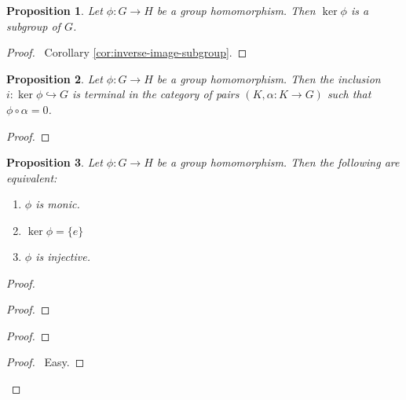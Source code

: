 \documentclass{book}
\let\qed\relax
\newtheorem{prop}{Proposition}[chapter]
\theoremstyle{definition}
\newcommand{\inv}[1]{\ensuremath{{#1}^{-1}}}
\begin{document}
\begin{prop}
Let $\phi : G \rightarrow H$ be a group homomorphism. Then $\ker \phi$ is a subgroup of $G$.
\end{prop}

\begin{proof}
\pf\ Corollary \ref{cor:inverse-image-subgroup}. \qed
\end{proof}

\begin{prop}
Let $\phi : G \rightarrow H$ be a group homomorphism. Then the inclusion $i : \ker \phi \hookrightarrow G$ is terminal in the category of pairs $(K,\alpha : K \rightarrow G)$ such that $\phi \circ \alpha = 0$.
\end{prop}

\begin{proof}
\pf
{}
\qed
\end{proof}

\begin{prop}
Let $\phi : G \rightarrow H$ be a group homomorphism. Then the following are equivalent:
\begin{enumerate}
\item $\phi$ is monic.
\item $\ker \phi = \{e\}$
\item $\phi$ is injective.
\end{enumerate}
\end{prop}

\begin{proof}
\pf
{}
\begin{proof}
\end{proof}
\begin{proof}
	\step{d}{$\phi(x\inv{y}) = e$}
	\step{e}{$x \inv{y} \in \ker \phi$}
	\step{f}{$x \inv{y} = e$}
\end{proof}
\begin{proof}
	\pf\ Easy.
\end{proof}
\qed
\end{proof}
\end{document}
